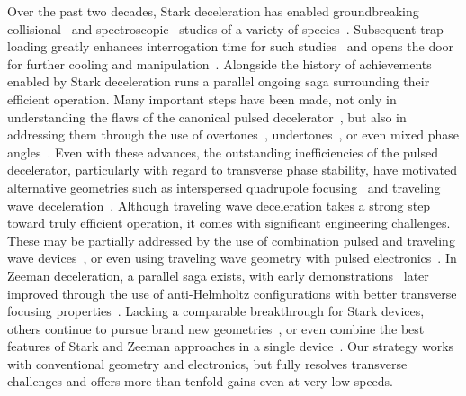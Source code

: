 \documentclass[%
 reprint,
 amsmath,amssymb,
 aps,
prl,
]{revtex4-1}
\begin{document}
Over the past two decades, Stark deceleration has enabled groundbreaking collisional~\cite{Sawyer2011,Kirste2012,Gao2018} and spectroscopic~\cite{Veldhoven2004,Hudson2006,Lev2006,Fast2018} studies of a variety of species~\cite{VanDeMeerakker2012}. 
Subsequent trap-loading greatly enhances interrogation time for such studies~\cite{Sawyer2008} and opens the door for further cooling and manipulation~\cite{Stuhl2012evap, Reens2017}. 
Alongside the history of achievements enabled by Stark deceleration runs a parallel ongoing saga surrounding their efficient operation. 
Many important steps have been made, not only in understanding the flaws of the canonical pulsed decelerator~\cite{VanDeMeerakker2006,Sawyer2008a}, but also in addressing them through the use of overtones~\cite{VanDeMeerakker2005a,Scharfenberg2009}, undertones~\cite{Zhang2016}, or even mixed phase angles~\cite{Parazzoli2009,Hou2013}. 
Even with these advances, the outstanding inefficiencies of the pulsed decelerator, particularly with regard to transverse phase stability, have motivated alternative geometries such as interspersed quadrupole focusing~\cite{Sawyer2008a} and traveling wave deceleration~\cite{Osterwalder2010,VandenBerg2014,Fabrikant2014}.
Although traveling wave deceleration takes a strong step toward truly efficient operation, it comes with significant engineering challenges. 
These may be partially addressed by the use of combination pulsed and traveling wave devices~\cite{Quintero-Perez2013}, or even using traveling wave geometry with pulsed electronics~\cite{Hou2016,Shyur2017}. 
In Zeeman deceleration, a parallel saga exists, with early demonstrations~\cite{Vanhaecke2007,Narevicius2008} later improved through the use of anti-Helmholtz configurations with better transverse focusing properties~\cite{LavertOfir2011,Dulitz2014}.
Lacking a comparable breakthrough for Stark devices, others continue to pursue brand new geometries~\cite{Wang2016}, or even combine the best features of Stark and Zeeman approaches in a single device~\cite{Cremers2017,Plomp2019}.
Our strategy works with conventional geometry and electronics, but fully resolves transverse challenges and offers more than tenfold gains even at very low speeds.
\end{document}
